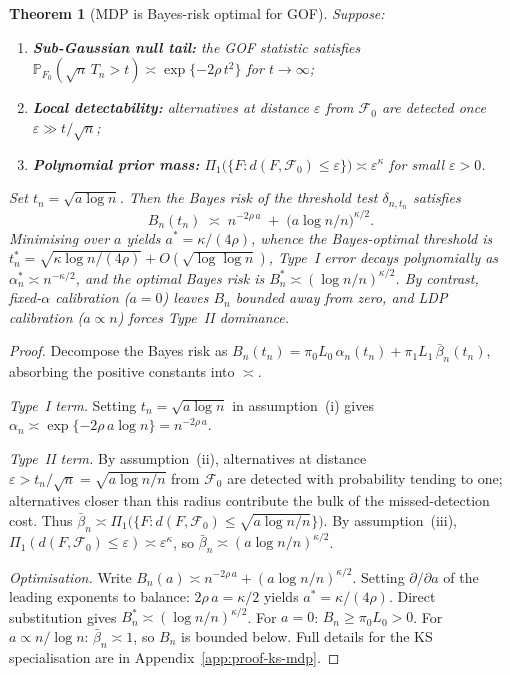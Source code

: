 \documentclass[10pt,a4paper]{amsart}
\newtheorem{theorem}{Theorem}
\newcommand{\PP}{\mathbb{P}}
\newcommand{\calF}{\mathcal{F}}
\newcommand{\rhotail}{\rho}  %
\begin{document}
\begin{theorem}[MDP is Bayes-risk optimal for GOF]\label{thm:mdp-generic}
Suppose:
\begin{enumerate}[label=(\roman*),leftmargin=2em]
\item \textbf{Sub-Gaussian null tail:} the GOF statistic satisfies $\PP_{F_0}(\sqrt{n}\,T_n > t) \asymp \exp\{-2\rhotail\,t^2\}$ for $t\to\infty$;
\item \textbf{Local detectability:} alternatives at distance $\varepsilon$ from $\calF_0$ are detected once $\varepsilon \gg t/\sqrt{n}$;
\item \textbf{Polynomial prior mass:} $\Pi_1\!\bigl(\{F : d(F,\calF_0) \le \varepsilon\}\bigr) \asymp \varepsilon^{\kappa}$ for small $\varepsilon > 0$.
\end{enumerate}
Set $t_n = \sqrt{a\log n}$.  Then the Bayes risk of the threshold test $\delta_{n,t_n}$ satisfies
\begin{equation}\label{eq:generic-risk-decomp}
B_n(t_n) \;\asymp\; n^{-2\rhotail\,a} \;+\; \bigl(a\log n / n\bigr)^{\kappa/2}.
\end{equation}
Minimising over $a$ yields $a^{*} = \kappa/(4\rhotail)$, whence
the Bayes-optimal threshold is $t_n^{*} = \sqrt{\kappa\log n/(4\rhotail)} + O(\sqrt{\log\log n})$,
Type~I error decays polynomially as $\alpha_n^{*} \asymp n^{-\kappa/2}$,
and the optimal Bayes risk is $B_n^{*} \asymp (\log n / n)^{\kappa/2}$.
By contrast, fixed-$\alpha$ calibration ($a=0$) leaves $B_n$ bounded away from zero, and LDP calibration ($a \propto n$) forces Type~II dominance.
\end{theorem}

\begin{proof}
Decompose the Bayes risk as $B_n(t_n) = \pi_0 L_0\,\alpha_n(t_n) + \pi_1 L_1\,\bar\beta_n(t_n)$, absorbing the positive constants into $\asymp$.

\emph{Type~I term.}
Setting $t_n = \sqrt{a\log n}$ in assumption~(i) gives $\alpha_n \asymp \exp\{-2\rhotail\, a\log n\} = n^{-2\rhotail\,a}$.

\emph{Type~II term.}
By assumption~(ii), alternatives at distance $\varepsilon > t_n/\sqrt{n} = \sqrt{a\log n/n}$ from $\calF_0$ are detected with probability tending to one; alternatives closer than this radius contribute the bulk of the missed-detection cost.
Thus $\bar\beta_n \asymp \Pi_1\!\bigl(\{F: d(F,\calF_0) \le \sqrt{a\log n/n}\}\bigr)$.
By assumption~(iii), $\Pi_1(d(F,\calF_0)\le\varepsilon)\asymp \varepsilon^{\kappa}$, so $\bar\beta_n \asymp (a\log n/n)^{\kappa/2}$.

\emph{Optimisation.}
Write $B_n(a) \asymp n^{-2\rhotail\,a} + (a\log n/n)^{\kappa/2}$.
Setting $\partial/\partial a$ of the leading exponents to balance: $2\rhotail\,a = \kappa/2$ yields $a^{*}=\kappa/(4\rhotail)$.
Direct substitution gives $B_n^{*} \asymp (\log n/n)^{\kappa/2}$.
For $a=0$: $B_n \ge \pi_0 L_0 > 0$.
For $a \propto n/\log n$: $\bar\beta_n \asymp 1$, so $B_n$ is bounded below.
Full details for the KS specialisation are in Appendix~\ref{app:proof-ks-mdp}.
\end{proof}
\end{document}
